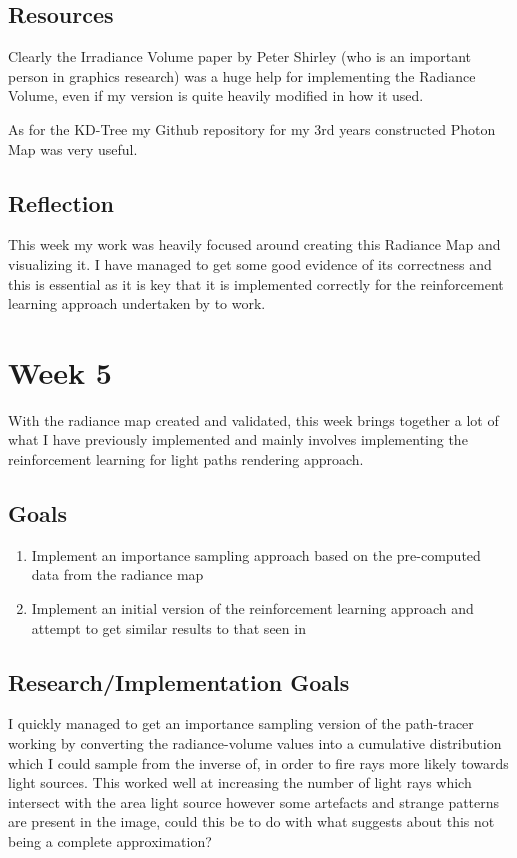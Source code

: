 \documentclass[conference]{IEEEtran}
\begin{document}
\subsection{Resources}
Clearly the Irradiance Volume paper \cite{greger1998irradiance} by Peter Shirley (who is an important person in graphics research) was a huge help for implementing the Radiance Volume, even if my version is quite heavily modified in how it used. 

As for the KD-Tree my Github repository for my 3rd years constructed Photon Map was very useful. 

\subsection{Reflection}
This week my work was heavily focused around creating this Radiance Map and visualizing it. I have managed to get some good evidence of its correctness and this is essential as it is key that it is implemented correctly for the reinforcement learning approach undertaken by \cite{dahm2017learning} to work.

\section*{Week 5}
With the radiance map created and validated, this week brings together a lot of what I have previously implemented and mainly involves implementing the reinforcement learning for light paths rendering approach. 

\subsection{Goals}
\begin{enumerate}
\item Implement an importance sampling approach based on the pre-computed data from the radiance map
\item Implement an initial version of the reinforcement learning approach and attempt to get similar results to that seen in  \cite{dahm2017learning}
\end{enumerate}

\subsection{Research/Implementation Goals}
I quickly managed to get an importance sampling version of the path-tracer working by converting the radiance-volume values into a cumulative distribution which I could sample from the inverse of, in order to fire rays more likely towards light sources. This worked well at increasing the number of light rays which intersect with the area light source however some artefacts and strange patterns are present in the image, could this be to do with what \cite{dahm2017learning} suggests about this not being a complete approximation?
\end{document}
